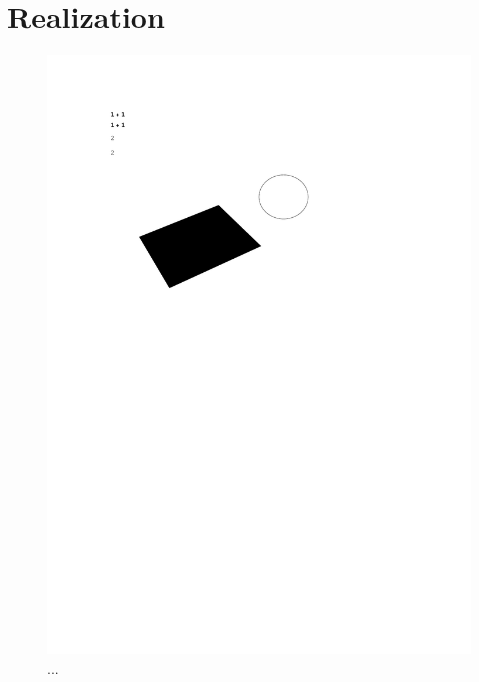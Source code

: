 \documentclass[../Paper.tex]{subfiles}
\begin{document}
\section{Realization}

\begin{figure}[H]
\centering
\includegraphics[width=12cm]{../Figures/1.pdf}
\caption{...}
\label{fig1}
\end{figure}
\end{document}
